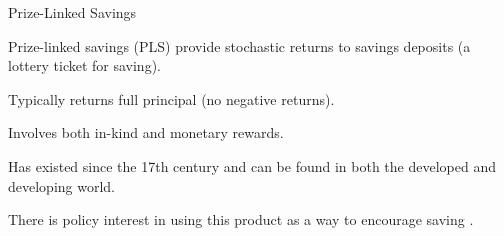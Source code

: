 \documentclass[aspectratio=169]{beamer}
\newenvironment{wideitemize}{\itemize\addtolength{\itemsep}{10pt}}{\enditemize}
\begin{document}


		
		
		



\begin{frame}{Prize-Linked Savings}

	Prize-linked savings (PLS) provide stochastic returns to savings deposits (a lottery ticket for saving).

	\begin{wideitemize}
		\item Typically returns full principal (no negative returns).
		\item Involves both in-kind and monetary rewards.
		\item Has existed since the 17th century and can be found in both the developed and developing world.
		\item There is policy interest in using this product as a way to encourage saving \parencite{kearney_making_2010}.
	\end{wideitemize}

\end{frame}

\end{document}
